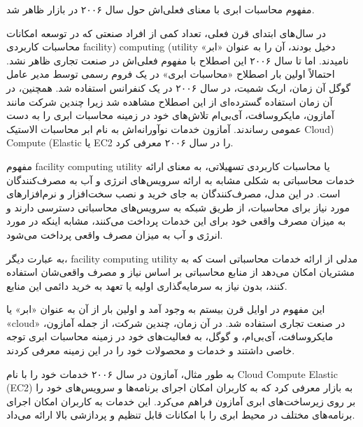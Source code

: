 \documentclass{book}
\begin{document}
            \begin{addinfo}
                
                مفهوم محاسبات ابری با معنای فعلی‌اش حول سال ۲۰۰۶ در بازار ظاهر شد.
                
            \end{addinfo}

            در سال‌های ابتدای قرن فعلی، تعداد کمی از افراد صنعتی که در توسعه امکانات محاسبات کاربردی facility) computing (utility  دخیل بودند، آن را به عنوان «ابر» نامیدند. اما تا سال ۲۰۰۶ این اصطلاح با مفهوم فعلی‌اش در صنعت تجاری ظاهر نشد. احتمالاً اولین بار اصطلاح «محاسبات ابری» در یک فروم رسمی توسط مدیر عامل گوگل آن زمان، اریک شمیت، در سال ۲۰۰۶ در یک کنفرانس استفاده شد. همچنین، در آن زمان استفاده گسترده‌ای از این اصطلاح مشاهده شد زیرا چندین شرکت مانند آمازون، مایکروسافت، آی‌بی‌ام تلاش‌های خود در زمینه محاسبات ابری را به دست عمومی رساندند. آمازون خدمات نوآورانه‌اش به نام ابر محاسبات الاستیک Cloud) Compute (Elastic یا EC2 را در سال ۲۰۰۶ معرفی کرد.

            \begin{addinfo2}
                
                مفهوم facility computing utility یا محاسبات کاربردی تسهیلاتی، به معنای ارائه خدمات محاسباتی به شکلی مشابه به ارائه سرویس‌های انرژی و آب به مصرف‌کنندگان است. در این مدل، مصرف‌کنندگان به جای خرید و نصب سخت‌افزار و نرم‌افزارهای مورد نیاز برای محاسبات، از طریق شبکه به سرویس‌های محاسباتی دسترسی دارند و به میزان مصرف واقعی خود برای این خدمات پرداخت می‌کنند، مشابه اینکه در مورد انرژی و آب به میزان مصرف واقعی پرداخت می‌شود.

                به عبارت دیگر، facility computing utility مدلی از ارائه خدمات محاسباتی است که به مشتریان امکان می‌دهد از منابع محاسباتی بر اساس نیاز و مصرف واقعی‌شان استفاده کنند، بدون نیاز به سرمایه‌گذاری اولیه یا تعهد به خرید دائمی این منابع.

                این مفهوم در اوایل قرن بیستم به وجود آمد و اولین بار از آن به عنوان «ابر» یا «cloud» در صنعت تجاری استفاده شد. در آن زمان، چندین شرکت، از جمله آمازون، مایکروسافت، آی‌بی‌ام، و گوگل، به فعالیت‌های خود در زمینه محاسبات ابری توجه خاصی داشتند و خدمات و محصولات خود را در این زمینه معرفی کردند.

                به طور مثال، آمازون در سال ۲۰۰۶ خدمات خود را با نام Cloud Compute Elastic (EC2) به بازار معرفی کرد که به کاربران امکان اجرای برنامه‌ها و سرویس‌های خود را بر روی زیرساخت‌های ابری آمازون فراهم می‌کرد. این خدمات به کاربران امکان اجرای برنامه‌های مختلف در محیط ابری را با امکانات قابل تنظیم و پردازشی بالا ارائه می‌داد.

            \end{addinfo2}
\end{document}
